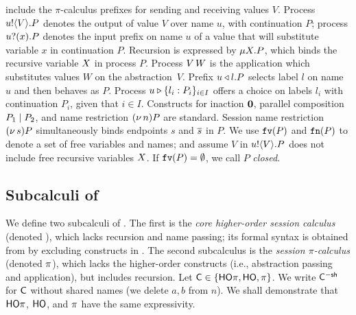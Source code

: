 include the
$\pi$-calculus prefixes for sending and receiving values $V$.
Process $u ! \langle V \rangle . P$ denotes the output of value $V$
over name $u$, with continuation $P$;
process $u ? (x) . P$ denotes the input prefix on name $u$ of a value
that 
will substitute variable $x$ in continuation $P$. 
Recursion is expressed by $\mu X. P$,
which binds the recursive variable $X$ in process $P$.
Process 
$V\, {W}$ 
is the application
which substitutes values $W$ on the abstraction~$V$. 
Prefix $u \triangleleft l . P$ selects label $l$ on name $u$ and then behaves as $P$.
Process $u \triangleright \{l_i: P_i\}_{i \in I}$ offers a choice on labels $l_i$ with
continuation $P_i$, given that $i \in I$.
Constructs for 
inaction $\mathbf{0}$,  parallel composition $P_1 \;|\; P_2$, and 
name restriction $(\nu\, n) P$ are standard.
Session name restriction $(\nu\, s) P$ simultaneously binds endpoints $s$ and $\overline{s}$ in $P$.
We use $\mathtt{fv}(P)$ and $\mathtt{fn}(P)$ to denote a set of free 
variables and names; 
and assume $V$ in $u ! \langle V \rangle .{P}$ does not include free recursive 
variables $X$. 
If $\mathtt{fv}(P) = \emptyset$, we call $P$ {\em closed}.

\subsection{Subcalculi of \HOp}
\label{subsec:subcalculi}
\noi
We define two subcalculi of \HOp. 
The first is the 
{\em core higher-order session calculus} (denoted \HO),
which lacks recursion and name passing; its 
formal syntax is obtained from  by excluding 
constructs in .
The second subcalculus is 
the {\em session $\pi$-calculus} 
(denoted $\pi$), which 
lacks  the
higher-order constructs
(i.e., abstraction passing and application), but includes recursion.
Let $\mathsf{C} \in \{\mathsf{HO}\pi, \mathsf{HO}, \pi\}$. We write 
$\mathsf{C}^{-\mathsf{sh}}$ for $\mathsf{C}$ without shared names
(we delete $a,b$ from $n$). 
We shall demonstrate that 
$\mathsf{HO}\pi$, $\mathsf{HO}$, and $\pi$ have the same expressivity.

